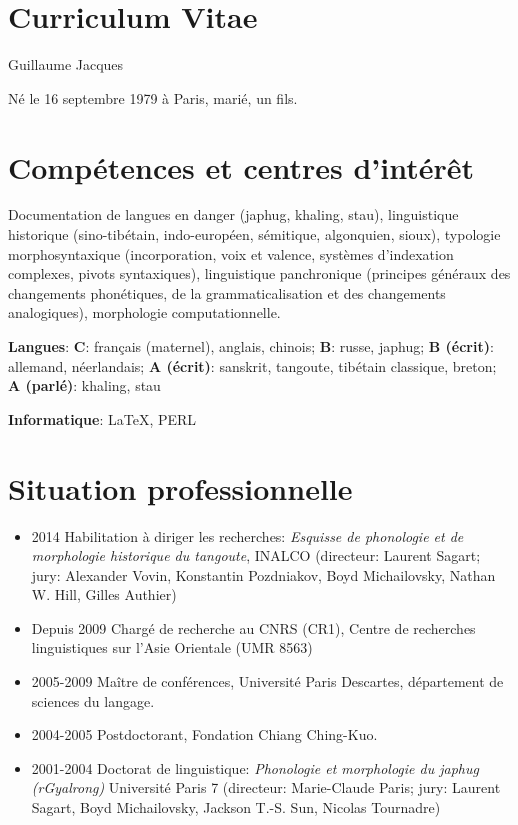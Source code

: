 \documentclass[oldfontcommands,oneside,a4paper,11pt]{article}
\begin{document}
 \sloppy
\section*{{\LARGE Curriculum Vitae}}
Guillaume Jacques

% 
Né le 16 septembre 1979 à Paris, marié, un fils.
\sloppy
\section*{Compétences et centres d’intérêt}
Documentation de langues en danger (japhug, khaling, stau), linguistique historique (sino-tibétain, indo-européen, sémitique, algonquien, sioux), typologie morphosyntaxique (incorporation, voix et valence, systèmes d'indexation complexes, pivots syntaxiques), linguistique panchronique (principes généraux des changements phonétiques, de la grammaticalisation et des changements analogiques), morphologie computationnelle.

\textbf{Langues}:  \textbf{C}: français (maternel), anglais, chinois; 
   \textbf{B}: russe, japhug; 
  \textbf{B (écrit)}: allemand, néerlandais;
  \textbf{A (écrit)}: sanskrit, tangoute, tibétain classique, breton;  \textbf{A (parlé)}: khaling, stau
  
    \textbf{Informatique}: \LaTeX, PERL
\section*{Situation professionnelle}
\begin{itemize}
\item 2014 Habilitation à diriger les recherches: \textit{Esquisse de phonologie et de morphologie historique du tangoute}, INALCO  (directeur: Laurent Sagart; jury: Alexander Vovin, Konstantin Pozdniakov, Boyd Michailovsky, Nathan W. Hill, Gilles Authier)
\item Depuis 2009 Chargé de recherche au CNRS (CR1), Centre de recherches linguistiques sur l'Asie Orientale (UMR 8563)
\item 2005-2009 Maître de conférences, Université Paris Descartes, département de sciences du langage.
\item 2004-2005 Postdoctorant, Fondation Chiang Ching-Kuo.
\item 2001-2004 Doctorat de linguistique: \textit{Phonologie et morphologie du japhug (rGyalrong)} Université Paris 7 (directeur: Marie-Claude Paris; jury: Laurent Sagart, Boyd Michailovsky, Jackson T.-S. Sun, Nicolas Tournadre)
\end{itemize}
 
\end{document}
